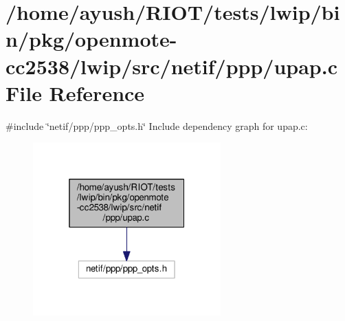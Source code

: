 \hypertarget{openmote-cc2538_2lwip_2src_2netif_2ppp_2upap_8c}{}\section{/home/ayush/\+R\+I\+O\+T/tests/lwip/bin/pkg/openmote-\/cc2538/lwip/src/netif/ppp/upap.c File Reference}
\label{openmote-cc2538_2lwip_2src_2netif_2ppp_2upap_8c}
{\ttfamily \#include \char`\"{}netif/ppp/ppp\+\_\+opts.\+h\char`\"{}}\newline
Include dependency graph for upap.\+c\+:
\nopagebreak
\begin{figure}[H]
\begin{center}
\leavevmode
\includegraphics[width=205pt]{openmote-cc2538_2lwip_2src_2netif_2ppp_2upap_8c__incl}
\end{center}
\end{figure}
